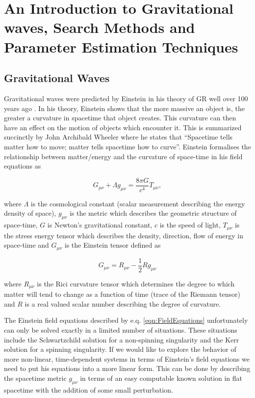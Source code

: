 \chapter[Introduction to Gravitational waves]{An Introduction to Gravitational waves, Search Methods and Parameter Estimation Techniques}

\section{Gravitational Waves}

Gravitational waves were predicted by Einstein in his theory of \ac{GR} well over 100 years ago \cite{GR_Einstein_paper}. In his theory, Einstein shows that the more massive an object is, the greater a curvature in spacetime that object creates. This curvature can then have an effect on the motion of objects which encounter it. This is summarized succinctly by John Archibald Wheeler where he states that ``Spacetime tells matter how to move; matter tells spacetime how to curve''. Einstein formalises the relationship between matter/energy and the curvature of space-time in his field equations as

\begin{equation}\label{eqn:FieldEquations}
    G_{\mu \nu} + \Lambda g_{\mu \nu} = \frac{8 \pi G}{c^{4}} T_{\mu \nu},
\end{equation}{}

where $\Lambda$ is the cosmological constant (scalar measurement describing the energy density of space), $g_{\mu \nu}$ is the metric which describes the geometric structure of space-time, $G$ is Newton's gravitational constant, $c$ is the speed of light, $T_{\mu \nu}$ is the stress energy tensor which describes the density, direction, flow of energy in space-time and $G_{\mu \nu}$ is the Einstein tensor defined as

\begin{equation}
    G_{\mu \nu} = R_{\mu \nu} - \frac{1}{2} R g_{\mu \nu}
\end{equation}

where $R_{\mu \nu}$ is the Rici curvature tensor which determines the degree to which matter will tend to change as a function of time (trace of the Riemann tensor) and $R$ is a real valued scalar number describing the degree of curvature. 

%
%
The Einstein field equations described by e.q. \ref{eqn:FieldEquations} unfortunately can only be solved exactly in a limited number of situations. These situations include the Schwartzchild solution for a non-spinning singularity and the Kerr solution for a spinning singularity. If we would like to explore the behavior of more non-linear, time-dependent systems in terms of Einstein's field equations we need to put his equations into a more linear form. This can be done by describing the spacetime metric $g_{\mu\nu}$ in terms of an easy computable known solution in flat spacetime with the addition of some small perturbation.

